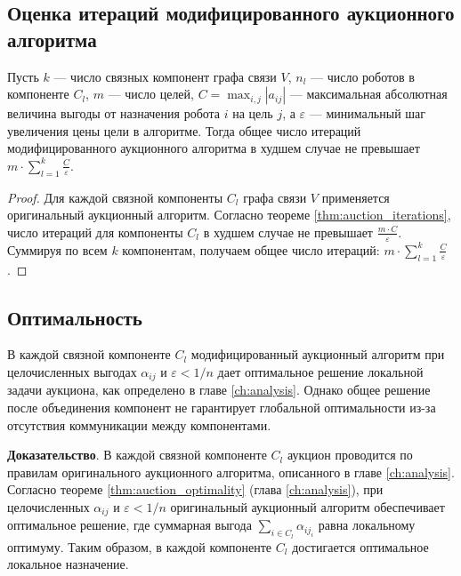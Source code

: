 \subsection{Оценка итераций модифицированного аукционного алгоритма}

\begin{theorem}
\label{thm:mod_auction_iterations}
Пусть \( k \) — число связных компонент графа связи \( V \), \( n_l \) — число роботов в компоненте \( C_l \), \( m \) — число целей, \( C = \max_{i,j} |a_{ij}| \) — максимальная абсолютная величина выгоды от назначения робота \( i \) на цель \( j \), а \( \varepsilon \) — минимальный шаг увеличения цены цели в алгоритме. Тогда общее число итераций модифицированного аукционного алгоритма в худшем случае не превышает \(m \cdot \sum_{l=1}^k \frac{C}{\varepsilon}\).
\end{theorem}

\begin{proof}
Для каждой связной компоненты \( C_l \) графа связи \( V \) применяется оригинальный аукционный алгоритм. Согласно теореме \ref{thm:auction_iterations}, число итераций для компоненты \( C_l \) в худшем случае не превышает \( \frac{m \cdot C}{\varepsilon} \). Суммируя по всем \( k \) компонентам, получаем общее число итераций: \(m \cdot \sum_{l=1}^k \frac{C}{\varepsilon}\).
\end{proof}
\subsection{Оптимальность}

\begin{theorem}
\label{thm:mod_auction_optimality}
В каждой связной компоненте \( C_l \) модифицированный аукционный алгоритм при целочисленных выгодах \( \alpha_{ij} \) и \( \varepsilon < 1/n \) дает оптимальное решение локальной задачи аукциона, как определено в главе \ref{ch:analysis}. Однако общее решение после объединения компонент не гарантирует глобальной оптимальности из-за отсутствия коммуникации между компонентами.
\end{theorem}

\textbf{Доказательство}. 
В каждой связной компоненте \( C_l \) аукцион проводится по правилам оригинального аукционного алгоритма, описанного в главе \ref{ch:analysis}. Согласно теореме \ref{thm:auction_optimality} (глава \ref{ch:analysis}), при целочисленных \( \alpha_{ij} \) и \( \varepsilon < 1/n \) оригинальный аукционный алгоритм обеспечивает оптимальное решение, где суммарная выгода \( \sum_{i \in C_l} \alpha_{i j_i} \) равна локальному оптимуму. Таким образом, в каждой компоненте \( C_l \) достигается оптимальное локальное назначение. 

